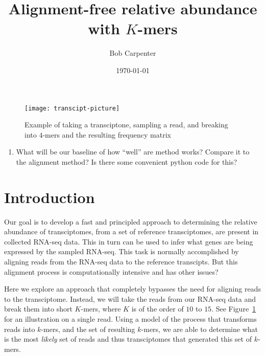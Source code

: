 \documentclass[11pt]{article}
\title{Alignment-free relative abundance with $K$-mers}
\author{Bob Carpenter}
\date{\today}
\newcommand{\rob}[1]{\todo[inline]{\textbf{Robert: }#1}}
\begin{document}
\maketitle



\begin{figure}
\centering
\texttt{[image: transcipt-picture]}
\caption{Example of taking a transciptone, sampling a read, and breaking into $4$-mers and the resulting frequency matrix}
\label{fig:transcipt-picture}
\end{figure}


\rob{Questions}
\begin{enumerate}
\item What will be our baseline of how ``well'' are method works? Compare it to the alignment method? Is there some convenient python code for this?
\end{enumerate}
\section{Introduction}

Our goal is to develop a fast and principled approach to determining the relative abundance of transciptomes, from a set of reference transciptomes, are present in collected RNA-seq data. This in turn can be used to infer what genes are being expressed by the sampled RNA-seq. This task is normally accomplished by aligning reads from the RNA-seq data to the reference transcipts. But this alignment process is computationally intensive and has other issues? 

Here we explore an approach that completely bypasses the need for aligning reads to the transciptome. Instead, we will take the reads from our RNA-seq data and break them into short $K$-mers, where $K$ is of the order of $10$ to $15.$ See Figure~\ref{fig:transcipt-picture} for an illustration on a single read. 
Using a model of the process that transforms reads into $k$-mers, and the set of resulting $k$-mers, we are able to determine what is the most \emph{likely} set of reads and thus transciptomes that generated this set of $k$-mers.  
\end{document}
